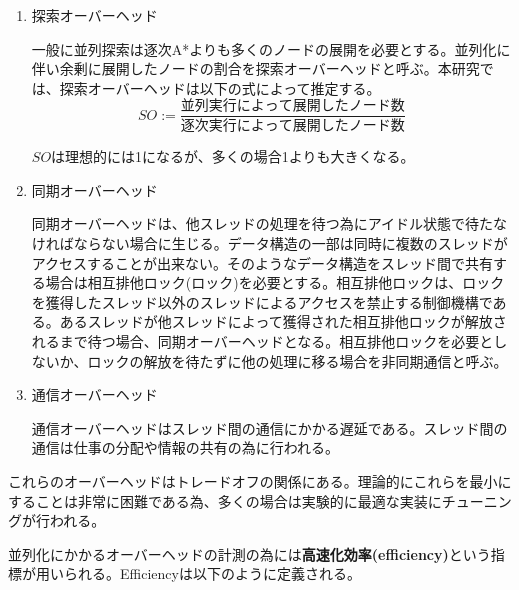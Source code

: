 \documentclass[uplatex]{jsarticle}
\begin{document}
\begin{enumerate}
\item 探索オーバーヘッド
\newline

一般に並列探索は逐次A*よりも多くのノードの展開を必要とする。並列化に伴い余剰に展開したノードの割合を探索オーバーヘッドと呼ぶ。本研究では、探索オーバーヘッドは以下の式によって推定する。
\newline
\begin{equation}
	SO := \frac{並列実行によって展開したノード数}{逐次実行によって展開したノード数}
\end{equation}


$SO$は理想的には1になるが、多くの場合1よりも大きくなる。
\newline

\item 同期オーバーヘッド
\newline

同期オーバーヘッドは、他スレッドの処理を待つ為にアイドル状態で待たなければならない場合に生じる。データ構造の一部は同時に複数のスレッドがアクセスすることが出来ない。そのようなデータ構造をスレッド間で共有する場合は相互排他ロック(ロック)を必要とする。相互排他ロックは、ロックを獲得したスレッド以外のスレッドによるアクセスを禁止する制御機構である。あるスレッドが他スレッドによって獲得された相互排他ロックが解放されるまで待つ場合、同期オーバーヘッドとなる。相互排他ロックを必要としないか、ロックの解放を待たずに他の処理に移る場合を非同期通信と呼ぶ。
\newline

\item 通信オーバーヘッド
\newline

通信オーバーヘッドはスレッド間の通信にかかる遅延である。スレッド間の通信は仕事の分配や情報の共有の為に行われる。

\end{enumerate}

これらのオーバーヘッドはトレードオフの関係にある。理論的にこれらを最小にすることは非常に困難である為、多くの場合は実験的に最適な実装にチューニングが行われる。

並列化にかかるオーバーヘッドの計測の為には\textbf{高速化効率(efficiency)}という指標が用いられる。Efficiencyは以下のように定義される。
\newline
\end{document}
